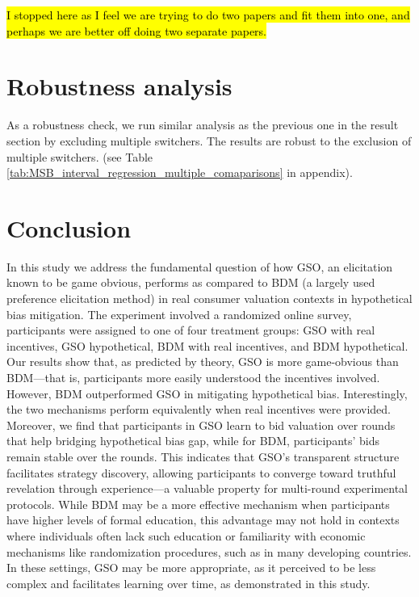 \documentclass[12pt]{article}
\begin{document}
\hl{I stopped here as I feel we are trying to do two papers and fit them into one, and perhaps we are better off doing two separate papers.}


\section{Robustness analysis}

As a robustness check, we run similar analysis as the previous one in the result section by excluding multiple switchers. The results are robust to the exclusion of multiple switchers. (see Table \ref{tab:MSB_interval_regression_multiple_comaparisons} in appendix). 
 




\section{Conclusion}

In this study we address the fundamental question of how GSO, an elicitation known to be game obvious, performs as compared to BDM (a largely used preference elicitation method) in real consumer valuation contexts in hypothetical bias mitigation. The experiment involved a randomized online survey, participants were assigned to one of four treatment groups: GSO with real incentives, GSO hypothetical, BDM with real incentives, and BDM hypothetical. Our results show that, as predicted by theory, GSO is more game-obvious than BDM—that is, participants more easily understood the incentives involved. However, BDM outperformed GSO in mitigating hypothetical bias. Interestingly, the two mechanisms perform equivalently when real incentives were provided. Moreover, we find that participants in GSO learn to bid valuation over rounds that help bridging hypothetical bias gap, while for BDM, participants' bids remain stable over the rounds. This indicates that GSO's transparent structure facilitates strategy discovery, allowing participants to converge toward truthful revelation through experience—a valuable property for multi-round experimental protocols.  While BDM may be a more effective mechanism when participants have higher levels of formal education, this advantage may not hold in contexts where individuals often lack such education or familiarity with economic mechanisms like randomization procedures, such as in many developing countries\citep{burchardi2021testing, akbarpour2020credible}. In these settings, GSO may be more appropriate, as it perceived to be less complex and facilitates learning over time, as demonstrated in this study.
\end{document}
